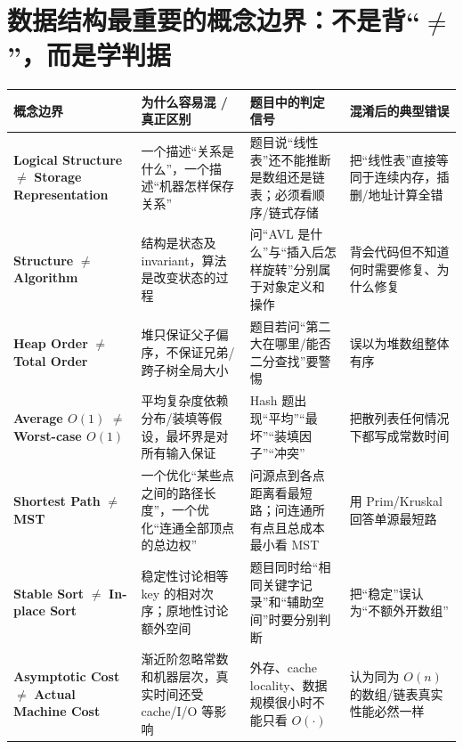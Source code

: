 \documentclass[11pt,a4paper,openany]{ctexbook}
\newcommand{\key}[1]{\textbf{\color{deep}#1}}
\begin{document}
\section{数据结构最重要的概念边界：不是背“\texorpdfstring{$\neq$}{!=}”，而是学判据}
\begin{longtable}{L{3.6cm}L{4.2cm}L{4.0cm}L{\dimexpr\linewidth-13.07cm\relax}}
\toprule
\textbf{概念边界} & \textbf{为什么容易混 / 真正区别} & \textbf{题目中的判定信号} & \textbf{混淆后的典型错误}\\
\midrule
\key{Logical Structure} $\neq$ \key{Storage Representation} & 一个描述“关系是什么”，一个描述“机器怎样保存关系” & 题目说“线性表”还不能推断是数组还是链表；必须看顺序/链式存储 & 把“线性表”直接等同于连续内存，插删/地址计算全错 \\
\midrule
\key{Structure} $\neq$ \key{Algorithm} & 结构是状态及 invariant，算法是改变状态的过程 & 问“AVL 是什么”与“插入后怎样旋转”分别属于对象定义和操作 & 背会代码但不知道何时需要修复、为什么修复 \\
\midrule
\key{Heap Order} $\neq$ \key{Total Order} & 堆只保证父子偏序，不保证兄弟/跨子树全局大小 & 题目若问“第二大在哪里/能否二分查找”要警惕 & 误以为堆数组整体有序 \\
\midrule
\key{Average $O(1)$} $\neq$ \key{Worst-case $O(1)$} & 平均复杂度依赖分布/装填等假设，最坏界是对所有输入保证 & Hash 题出现“平均”“最坏”“装填因子”“冲突” & 把散列表任何情况下都写成常数时间 \\
\midrule
\key{Shortest Path} $\neq$ \key{MST} & 一个优化“某些点之间的路径长度”，一个优化“连通全部顶点的总边权” & 问源点到各点距离看最短路；问连通所有点且总成本最小看 MST & 用 Prim/Kruskal 回答单源最短路 \\
\midrule
\key{Stable Sort} $\neq$ \key{In-place Sort} & 稳定性讨论相等 key 的相对次序；原地性讨论额外空间 & 题目同时给“相同关键字记录”和“辅助空间”时要分别判断 & 把“稳定”误认为“不额外开数组” \\
\midrule
\key{Asymptotic Cost} $\neq$ \key{Actual Machine Cost} & 渐近阶忽略常数和机器层次，真实时间还受 cache/I/O 等影响 & 外存、cache locality、数据规模很小时不能只看 $O(\cdot)$ & 认为同为 $O(n)$ 的数组/链表真实性能必然一样 \\
\bottomrule
\end{longtable}
\end{document}

